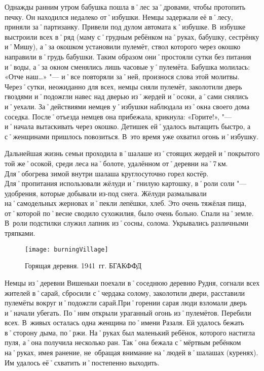 Однажды ранним утром бабушка пошла в˚лес за˚дровами, чтобы протопить печку. Он находился недалеко от˚избушки. Немцы задержали её в˚лесу, приняли за˚партизанку. Привели под дулом автомата к˚избушке. В~избушке выстроили всех в˚ряд (маму с˚грудным ребёнком на˚руках, бабушку, сестрёнку и˚Мишу), а˚за окошком установили пулемёт, ствол которого через окошко направили в˚грудь бабушки. Таким образом они˚простояли сутки без питания и˚воды, а˚за окном сменялись лишь часовые у˚пулемёта. Бабушка молилась: «Отче наш…» "--- и˚все повторяли за˚ней, произнося слова этой молитвы. Через˚сутки, неожиданно для всех, немцы сняли пулемёт, заколотили дверь гвоздями и˚подожгли навес над дверью из˚жердей и˚осоки, а˚сами снялись и˚уехали. За˚действиями немцев у˚избушки наблюдала из˚окна своего дома соседка. После˚отъезда немцев она прибежала, крикнула: «Горите!», "--- и˚начала вытаскивать через окошко. Детишек ей˚удалось вытащить быстро, а с˚женщинами пришлось повозиться. В~это время уже охватил огонь и˚избушку.

Дальнейшая жизнь семьи проходила в˚шалаше из˚стоящих жердей и˚покрытого той же˚осокой, среди леса на˚болоте, удалённом от˚деревни на˚7\,км. Для˚обогрева зимой внутри шалаша круглосуточно горел костёр. Для˚пропитания использовали жёлуди и˚гнилую картошку, в˚роли соли "--- удобрения, которые добывали из-под снега. Жёлуди размалывали на˚самодельных жерновах и˚пекли лепёшки, хлеб. Это очень тяжёлая пища, от˚которой по˚весне сводило сухожилия, было очень больно. Спали на˚земле. В~роли подстилки служил лапник из˚сосны, солома. Укрывались различными тряпками.


\begin{wrapfigure}{O}{.4\textwidth}
\centering
\texttt{[image: burningVillage]}
\caption[Горящая деревня. 1941~гг. БГАКФФД]{Горящая деревня. 1941~гг. БГАКФФД\footnotemark}
\label{fig:burningVillage}
\end{wrapfigure}

Немцы из˚деревни Вишеньки поехали в˚соседнюю деревню Рудня, согнали всех жителей в˚сарай, сбросили с˚чердака солому, заколотили двери, расставили пулемёты вокруг и˚подожгли сарай.При˚горении сарая люди взломали дверь и˚начали убегать. По˚ним открыли ураганный огонь из˚пулемётов. Перебили всех. В~живых осталась одна женщина по˚имени Разаля. Ей удалось бежать в˚сторону дыма, по˚ржи. На˚руках был маленький ребёнок, которого настигла пуля, а˚она получила несколько ран. Так˚она бежала с˚мёртвым ребёнком на˚руках, имея ранение, не~обращая внимание на˚людей в˚шалашах (куренях). Им удалось её˚схватить и˚постепенно выходить. 

